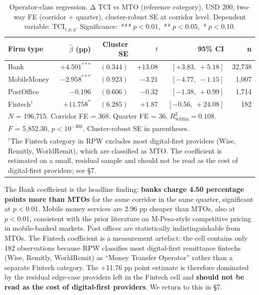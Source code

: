 \documentclass[
  11pt,
]{article}
\begin{document}
\begin{table}[h]
\centering
\caption{Operator-class regression. Δ TCI vs MTO (reference category), USD 200, two-way FE (corridor + quarter), cluster-robust SE at corridor level. Dependent variable: $\text{TCI}_{i,p,q}$. Significance: \emph{*** $p < 0.01$, ** $p < 0.05$, * $p < 0.10$}.}
\begin{tabular}{lrrrrr}
\toprule
\textbf{Firm type} & \textbf{$\hat{\beta}$ (pp)} & \textbf{Cluster SE} & \textbf{$t$} & \textbf{95\% CI} & \textbf{n} \\
\midrule
Bank        & $+4.501^{***}$ & $(0.344)$ & $+13.08$ & $[+3.83,\ +5.18]$  & 32{,}738 \\
MobileMoney & $-2.958^{***}$ & $(0.923)$ & $-3.21$  & $[-4.77,\ -1.15]$  &  1{,}007 \\
PostOffice  & $-0.196$       & $(0.606)$ & $-0.32$  & $[-1.38,\ +0.99]$  &  1{,}714 \\
Fintech$^{\dagger}$ & $+11.758^{*}$  & $(6.285)$ & $+1.87$  & $[-0.56,\ +24.08]$ &     182 \\
\midrule
\multicolumn{6}{l}{$N$ = 196{,}715. Corridor FE = 368. Quarter FE = 36. $R^2_{\text{within}} = 0.108$.} \\
\multicolumn{6}{l}{$F$ = 5{,}852.30, $p < 10^{-300}$. Cluster-robust SE in parentheses.} \\
\multicolumn{6}{p{0.95\textwidth}}{\footnotesize $^{\dagger}$The Fintech category in RPW excludes most digital-first providers (Wise, Remitly, WorldRemit), which are classified as MTO. The coefficient is estimated on a small, residual sample and should not be read as the cost of digital-first providers; see §7.} \\
\bottomrule
\end{tabular}
\end{table}

The Bank coefficient is the headline finding: \textbf{banks charge 4.50
percentage points more than MTOs} for the same corridor in the same
quarter, significant at \(p < 0.01\). Mobile money services are 2.96 pp
cheaper than MTOs, also at \(p < 0.01\), consistent with the prior
literature on M-Pesa-style competitive pricing in mobile-banked markets.
Post offices are statistically indistinguishable from MTOs. The Fintech
coefficient is a measurement artefact: the cell contains only 182
observations because RPW classifies most digital-first remittance
fintechs (Wise, Remitly, WorldRemit) as ``Money Transfer Operator''
rather than a separate Fintech category. The +11.76 pp point estimate is
therefore dominated by the residual edge-case providers left in the
Fintech cell and \textbf{should not be read as the cost of digital-first
providers}. We return to this in §7.
\end{document}
